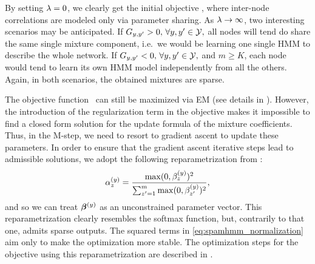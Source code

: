 By setting $\lambda=0$, we clearly get the initial objective , where inter-node correlations are modeled only via parameter sharing. As $\lambda \to \infty$, two interesting scenarios may be anticipated. If ${G}_{y,y'} > 0, \, \forall y,y' \in {\mathcal{Y}},$ all nodes will tend do share the same single mixture component, i.e.\ we would be learning one single HMM to describe the whole network. If ${G}_{y,y'} < 0, \, \forall y,y' \in {\mathcal{Y}},$ and $m \geq K$, each node would tend to learn its own HMM model independently from all the others. Again, in both scenarios, the obtained mixtures are sparse.

The objective function~ can still be maximized via EM (see details in ). However, the introduction of the regularization term in the objective makes it impossible to find a closed form solution for the update formula of the mixture coefficients. Thus, in the M-step, we need to resort to gradient ascent to update these parameters. In order to ensure that the gradient ascent iterative steps lead to admissible solutions, we adopt the following reparametrization from \citet{Yang2018}:
\begin{equation}
\label{eq:spamhmm_normalization}
{\alpha}^{(y)}_{z} = \frac{\max(0, {\beta^{(y)}_z})^2}{\sum_{z'=1}^m \max(0, {\beta^{(y)}_{z'}})^2}, 
\end{equation}
and so we can treat ${\bm{\beta}}^{(y)}$ as an unconstrained parameter vector. This reparametrization clearly resembles the softmax function, but, contrarily to that one, admits sparse outputs. The squared terms in \eqref{eq:spamhmm_normalization} aim only to make the optimization more stable. The optimization steps for the objective  using this reparametrization are described in .

